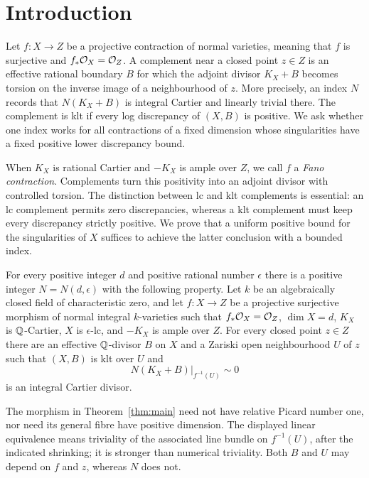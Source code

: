 \section{Introduction}
\label{sec:introduction}

Let $f\colon X\to Z$ be a projective contraction of normal varieties,
meaning that $f$ is surjective and $f_*\mathcal O_X=\mathcal O_Z$. A complement near a
closed point $z\in Z$ is an effective rational boundary $B$ for which the
adjoint divisor $K_X+B$ becomes torsion on the inverse image of a
neighbourhood of $z$. More precisely, an index $N$ records that
$N(K_X+B)$ is integral Cartier and linearly trivial there. The complement
is klt if every log discrepancy of $(X,B)$ is positive. We ask whether one
index works for all contractions of a fixed dimension whose singularities
have a fixed positive lower discrepancy bound.

When $K_X$ is rational Cartier and $-K_X$ is ample over $Z$, we call $f$ a
\emph{Fano contraction}. Complements turn this positivity into an adjoint
divisor with controlled torsion. The distinction between lc and klt
complements is essential: an lc complement permits zero discrepancies,
whereas a klt complement must keep every discrepancy strictly positive.
We prove that a uniform positive bound for the singularities of $X$
suffices to achieve the latter conclusion with a bounded index.

\begin{theorem}\label{thm:main}
For every positive integer $d$ and positive rational number $\epsilon$ there
is a positive integer $N=N(d,\epsilon)$ with the following property. Let $k$
be an algebraically closed field of characteristic zero, and let
$f\colon X\to Z$ be a projective surjective morphism of normal integral
$k$-varieties such that $f_*\mathcal O_X=\mathcal O_Z$, $\dim X=d$, $K_X$ is
$\mathbb Q$-Cartier, $X$ is $\epsilon$-lc, and $-K_X$ is ample over $Z$.
For every closed point $z\in Z$ there are an effective $\mathbb Q$-divisor $B$ on
$X$ and a Zariski open neighbourhood $U$ of $z$ such that $(X,B)$ is klt over
$U$ and
\[
 N(K_X+B)|_{f^{-1}(U)}\sim 0
\]
is an integral Cartier divisor.
\end{theorem}

The morphism in Theorem~\ref{thm:main} need not have relative Picard number
one, nor need its general fibre have positive dimension. The displayed
linear equivalence means triviality of the associated line bundle on
$f^{-1}(U)$, after the indicated shrinking; it is stronger than numerical
triviality. Both $B$ and $U$ may depend on $f$ and $z$, whereas $N$ does not.

